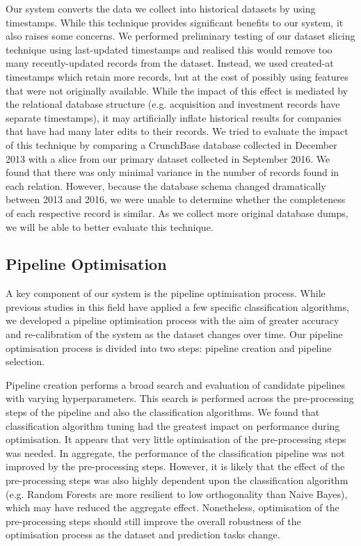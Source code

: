 \documentclass[../thesis/thesis.tex]{subfiles}
\begin{document}
Our system converts the data we collect into historical datasets by using timestamps. While this technique provides significant benefits to our system, it also raises some concerns. We performed preliminary testing of our dataset slicing technique using last-updated timestamps and realised this would remove too many recently-updated records from the dataset. Instead, we used created-at timestamps which retain more records, but at the cost of possibly using features that were not originally available. While the impact of this effect is mediated by the relational database structure (e.g. acquisition and investment records have separate timestamps), it may artificially inflate historical results for companies that have had many later edits to their records. We tried to evaluate the impact of this technique by comparing a CrunchBase database collected in December 2013 with a slice from our primary dataset collected in September 2016. We found that there was only minimal variance in the number of records found in each relation. However, because the database schema changed dramatically between 2013 and 2016, we were unable to determine whether the completeness of each respective record is similar. As we collect more original database dumps, we will be able to better evaluate this technique.

\subsection{Pipeline Optimisation}

A key component of our system is the pipeline optimisation process. While previous studies in this field have applied a few specific classification algorithms, we developed a pipeline optimisation process with the aim of greater accuracy and re-calibration of the system as the dataset changes over time. Our pipeline optimisation process is divided into two steps: pipeline creation and pipeline selection.

Pipeline creation performs a broad search and evaluation of candidate pipelines with varying hyperparameters. This search is performed across the pre-processing steps of the pipeline and also the classification algorithms. We found that classification algorithm tuning had the greatest impact on performance during optimisation. It appears that very little optimisation of the pre-processing steps was needed. In aggregate, the performance of the classification pipeline was not improved by the pre-processing steps. However, it is likely that the effect of the pre-processing steps was also highly dependent upon the classification algorithm (e.g. Random Forests are more resilient to low orthogonality than Naive Bayes), which may have reduced the aggregate effect. Nonetheless, optimisation of the pre-processing steps should still improve the overall robustness of the optimisation process as the dataset and prediction tasks change.
\end{document}

